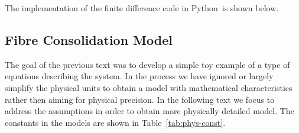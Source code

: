 \documentclass[twoside,a4paper,12pt]{article}
\newcommand{\tabref}[1]{Table~\ref{#1}}
\newcommand{\prog}[1]{\textsf{#1}}
\newcommand{\python}{\prog{Python}}
\begin{document}
The implementation of the finite difference code in \python\ is shown
below.
%


\subsection{Fibre Consolidation Model}

The goal of the previous text was to develop a simple toy example of a
type of equations describing the system. In the process we have ignored
or largely simplify the physical units to obtain a model with
mathematical characteristics rather then aiming for physical
precision. In the following text we focus to address the assumptions
in order to obtain more physically detailed model. The constants in the
models are shown in \tabref{tab:phys-const}.
\end{document}
